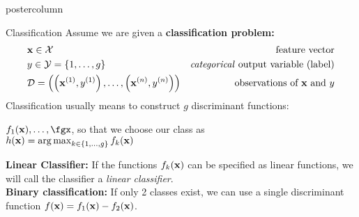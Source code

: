 \documentclass{beamer}
\begin{document}
\begin{frame}[fragile]{}
\begin{columns}
\begin{column}{.31\textwidth}
\begin{beamercolorbox}[center]{postercolumn}
\begin{minipage}{.98\textwidth}
{\begin{myblock}{Classification}
%             
Assume we are given a \textbf{classification problem:}
\begin{eqnarray*} & \mathbf{x} \in \mathcal{X} \quad & \text{feature vector}\\ & y \in \mathcal{Y} = \{1, \ldots, g\} \quad & \text{\emph{categorical} output variable (label)}\\ &\mathcal{D} = \left( \left(\mathbf{x}^{(1)}, y^{(1)}\right), \ldots, \left(\mathbf{x}^{(n)}, y^{(n)}\right)\right) & \text{observations of $\mathbf{x}$ and $y$} \end{eqnarray*}
\vspace*{1ex}
Classification usually means to construct $g$ discriminant functions:
  
  \hspace*{1ex}$f_1(\xv), \ldots, \fgx$, so that we choose our class as \\ 
  \hspace*{1ex} $h(\mathbf{x}) = \operatorname{arg\,max}_{k \in \{1, \ldots, g\}} f_{k}(\mathbf{x})$ 
  
  \vspace*{2ex}


\textbf{Linear Classifier:} If the functions $f_{k}(\mathbf{x})$ can be specified as linear functions, we will call 
\hspace*{1ex}the classifier a \emph{linear classifier}.\\


\textbf{Binary classification: }If only 2 classes exist, we can use a single discriminant function $f(\mathbf{x}) = f_{1}(\mathbf{x}) - f_{2}(\mathbf{x})$.  

\end{myblock}
			  }
			\end{minipage}
		\end{beamercolorbox}
	\end{column}
\end{columns}

\end{frame}
\end{document}
